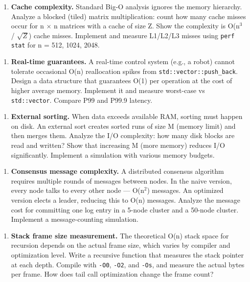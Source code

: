\begin{enumerate}
\item \textbf{Cache complexity.} Standard Big-O analysis ignores the memory hierarchy. Analyze a blocked (tiled) matrix multiplication: count how many cache misses occur for n $\times $ n matrices with a cache of size Z. Show the complexity is O(n$^{3}$ / $\sqrt {Z}$) cache misses. Implement and measure L1/L2/L3 misses using \texttt{perf stat} for n = 512, 1024, 2048.
\end{enumerate}

\begin{enumerate}
\item \textbf{Real-time guarantees.} A real-time control system (e.g., a robot) cannot tolerate occasional O(n) reallocation spikes from \texttt{std::vector::push\_back}. Design a data structure that guarantees O(1) per operation at the cost of higher average memory. Implement it and measure worst-case vs \texttt{std::vector}. Compare P99 and P99.9 latency.
\end{enumerate}

\begin{enumerate}
\item \textbf{External sorting.} When data exceeds available RAM, sorting must happen on disk. An external sort creates sorted runs of size M (memory limit) and then merges them. Analyze the I/O complexity: how many disk blocks are read and written? Show that increasing M (more memory) reduces I/O significantly. Implement a simulation with various memory budgets.
\end{enumerate}

\begin{enumerate}
\item \textbf{Consensus message complexity.} A distributed consensus algorithm requires multiple rounds of messages between nodes. In the naive version, every node talks to every other node — O(n$^{2}$) messages. An optimized version elects a leader, reducing this to O(n) messages. Analyze the message cost for committing one log entry in a 5-node cluster and a 50-node cluster. Implement a message-counting simulation.
\end{enumerate}

\begin{enumerate}
\item \textbf{Stack frame size measurement.} The theoretical O(n) stack space for recursion depends on the actual frame size, which varies by compiler and optimization level. Write a recursive function that measures the stack pointer at each depth. Compile with \texttt{-O0}, \texttt{-O2}, and \texttt{-Os}, and measure the actual bytes per frame. How does tail call optimization change the frame count?
\end{enumerate}

